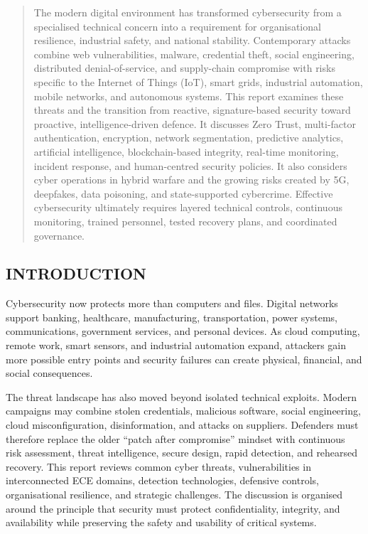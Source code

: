 \begin{multicols}{2}
  \begin{abstract}
    \bfseries
    { The modern digital environment has transformed cybersecurity from a specialised technical concern into a requirement for organisational resilience, industrial safety, and national stability. Contemporary attacks combine web vulnerabilities, malware, credential theft, social engineering, distributed denial-of-service, and supply-chain compromise with risks specific to the Internet of Things (IoT), smart grids, industrial automation, mobile networks, and autonomous systems. This report examines these threats and the transition from reactive, signature-based security toward proactive, intelligence-driven defence. It discusses Zero Trust, multi-factor authentication, encryption, network segmentation, predictive analytics, artificial intelligence, blockchain-based integrity, real-time monitoring, incident response, and human-centred security policies. It also considers cyber operations in hybrid warfare and the growing risks created by 5G, deepfakes, data poisoning, and state-supported cybercrime. Effective cybersecurity ultimately requires layered technical controls, continuous monitoring, trained personnel, tested recovery plans, and coordinated governance.\par}
  \end{abstract}

  \subsection*{\centering\uppercase{Introduction}}
  { Cybersecurity now protects more than computers and files. Digital networks support banking, healthcare, manufacturing, transportation, power systems, communications, government services, and personal devices. As cloud computing, remote work, smart sensors, and industrial automation expand, attackers gain more possible entry points and security failures can create physical, financial, and social consequences.\par}

  \noindent
  { The threat landscape has also moved beyond isolated technical exploits. Modern campaigns may combine stolen credentials, malicious software, social engineering, cloud misconfiguration, disinformation, and attacks on suppliers. Defenders must therefore replace the older “patch after compromise” mindset with continuous risk   assessment, threat intelligence, secure design, rapid detection, and rehearsed recovery.
  \noindent
  This report reviews common cyber threats, vulnerabilities in interconnected ECE domains, detection technologies, defensive controls, organisational resilience, and strategic challenges. The discussion is organised around the principle that security must protect confidentiality, integrity, and availability   while preserving the safety and usability of critical systems.\par}


\end{multicols}

